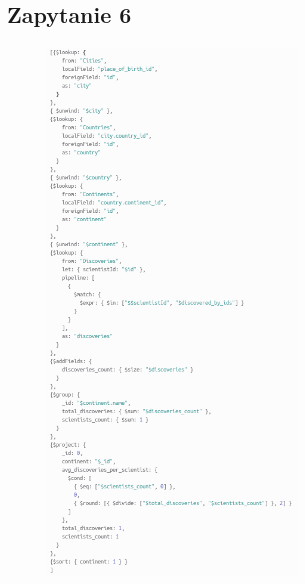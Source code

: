 \documentclass[11pt]{article}
\begin{document}
\newpage
	\subsection{Zapytanie 6}
		\begin{figure}[!ht]
			\begin{center}
				\includegraphics[width=250px]{m6.png}
			\end{center}
		\end{figure}

\newpage
\end{document}
